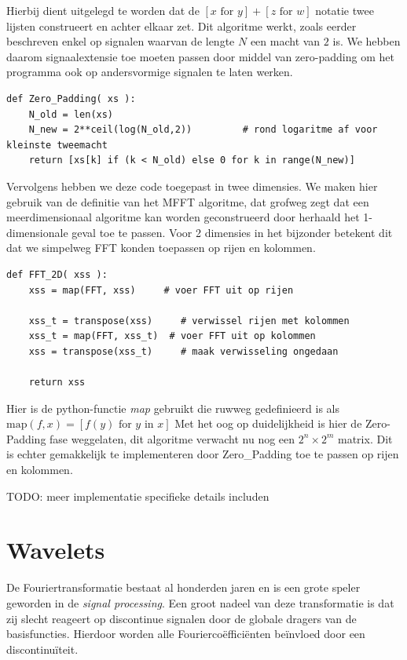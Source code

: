 \documentclass[11pt]{report}
\theoremstyle{plain}
\theoremstyle{remark}
\begin{document}
Hierbij dient uitgelegd te worden dat de $[x \text{ for } y] + [z \text{ for } w]$ notatie twee lijsten construeert en achter elkaar zet. Dit algoritme werkt, zoals eerder beschreven enkel op signalen waarvan de lengte
$N$ een macht van $2$ is. We hebben daarom signaalextensie toe moeten passen door middel van zero-padding
om het programma ook op andersvormige signalen te laten werken.

\begin{lstlisting}[caption={Zero-Padding algoritme in Python, voegt nullen toe tot een tweemacht is bereikt}]
def Zero_Padding( xs ):
    N_old = len(xs)
    N_new = 2**ceil(log(N_old,2))         # rond logaritme af voor kleinste tweemacht
    return [xs[k] if (k < N_old) else 0 for k in range(N_new)]
\end{lstlisting}

Vervolgens hebben we deze code toegepast in twee dimensies. We maken hier gebruik van de definitie van het
MFFT algoritme, dat grofweg zegt dat een meerdimensionaal algoritme kan worden geconstrueerd door herhaald 
het 1-dimensionale geval toe te passen. Voor 2 dimensies in het bijzonder betekent dit dat we simpelweg 
FFT konden toepassen op rijen en kolommen.

\begin{lstlisting}[caption=2-Dimensionaal FFT algoritme]
def FFT_2D( xss ):
    xss = map(FFT, xss)     # voer FFT uit op rijen

    xss_t = transpose(xss)     # verwissel rijen met kolommen
    xss_t = map(FFT, xss_t)  # voer FFT uit op kolommen
    xss = transpose(xss_t)     # maak verwisseling ongedaan 

    return xss
\end{lstlisting}
Hier is de python-functie \emph{map} gebruikt die ruwweg gedefinieerd is als 
$\text{map}(f,x) = [f(y) \text{ for } y \text{ in } x]$
Met het oog op duidelijkheid is hier de Zero-Padding fase weggelaten, 
dit algoritme verwacht nu nog een $2^n \times 2^m$ matrix.
Dit is echter gemakkelijk te implementeren door Zero\_Padding toe te passen op rijen en kolommen.

TODO: meer implementatie specifieke details includen

\fi
\chapter{Wavelets}
De Fouriertransformatie bestaat al honderden jaren en is een grote speler geworden in de \emph{signal processing}. Een groot nadeel van deze transformatie is dat zij slecht reageert op discontinue signalen door de globale dragers van de basisfuncties. Hierdoor worden alle Fourierco\"effici\"enten be\"invloed door een discontinu\"iteit.
\end{document}
